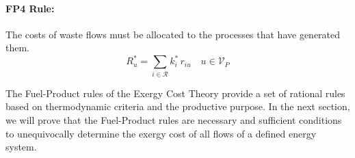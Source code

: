 \documentclass{ecos2018}
\begin{document}
\paragraph{FP4 Rule:} The costs of waste flows must be allocated to the processes that have generated them.
\begin{equation}
\label{eq:fprule4}
R_u^*=\sum_{i\in\mathcal{R}}{k_i^* \, r_{iu}} \quad u\in\mathcal{V}_P \tag{FP4}
\end{equation}

The Fuel-Product rules of the Exergy Cost Theory provide a set of rational rules based on thermodynamic criteria and the productive purpose. In the next section, we will prove that the Fuel-Product rules are necessary and sufficient conditions to unequivocally determine the exergy cost of all flows of a defined energy system.
\end{document}
